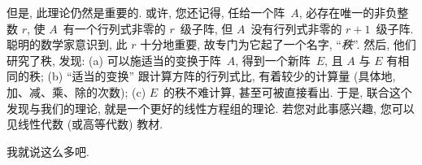 但是, 此理论仍然是重要的.
或许, 您还记得,
任给一个阵~\(A\),
必存在唯一的非负整数 \(r\),
使 \(A\)~有一个行列式非零的 \(r\)~级子阵,
但 \(A\)~没有行列式非零的 \(r+1\)~级子阵.
聪明的数学家意识到,
此 \(r\) 十分地重要,
故专门为它起了一个名字, ``\emph{秩}''.
然后, 他们研究了秩,
发现:
(a)
可以施适当的变换于阵~\(A\),
得到一个新阵~\(E\),
且 \(A\) 与 \(E\) 有相同的秩;
(b)
``适当的变换'' 跟计算方阵的行列式比,
有着较少的计算量
(具体地, 加、减、乘、除的次数);
(c)
\(E\)~的秩不难计算,
甚至可被直接看出.
于是, 联合这个发现与我们的理论,
就是一个更好的线性方程组的理论.
若您对此事感兴趣,
您可以见线性代数 (或高等代数) 教材.

我就说这么多吧.

\SenAsteriskoEnEnhavtabelo
